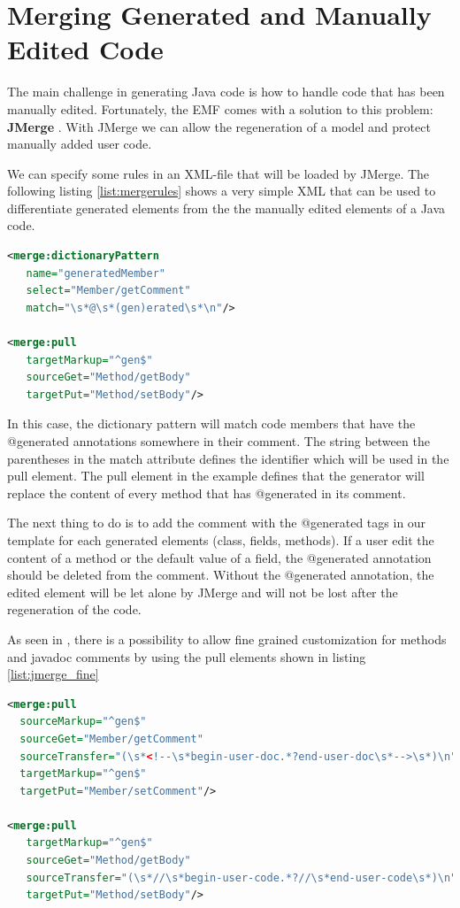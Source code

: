 \section{Merging Generated and Manually Edited Code}
The main challenge in generating Java code is how to handle code that has been manually edited. Fortunately, the EMF comes with a solution to this problem: \textbf{JMerge} \cite{JMERGEFAQ}. With JMerge we can allow the regeneration of a model and protect manually added user code. 

We can specify some rules in an XML-file that will be loaded by JMerge.  The following listing \ref{list:mergerules} shows a very simple XML that can be used to differentiate generated elements from the the manually edited elements of a Java code. 

\begin{lstlisting}[language=xml, caption = Example JMerge Rule, label=list:mergerules]
<merge:dictionaryPattern
   name="generatedMember" 
   select="Member/getComment" 
   match="\s*@\s*(gen)erated\s*\n"/>

<merge:pull 
   targetMarkup="^gen$"
   sourceGet="Method/getBody"
   targetPut="Method/setBody"/>
\end{lstlisting}

In this case, the dictionary pattern will match code members that have the @generated annotations somewhere in their comment. The string between the parentheses in the match attribute defines the identifier which will be used in the pull element. The pull element in the example defines that the generator will replace the content of every method that has @generated in its comment.

The next thing to do is to add the comment with the @generated tags in our template for each generated elements (class, fields, methods). 
If a user edit the content of a method or the default value of a field, the @generated annotation should be deleted from the comment. Without the @generated annotation, the edited element will be let alone by JMerge and will not be lost after the regeneration of the code.  

As seen in \cite{APJMERGE}, there is a possibility to allow fine grained customization for methods and javadoc comments by using the pull elements shown in listing \ref{list:jmerge_fine}
\begin{lstlisting}[language=xml, caption=JMerge Example: fine grained customization for javadoc comments and methods, label = list:jmerge_fine]
<merge:pull 
  sourceMarkup="^gen$"
  sourceGet="Member/getComment"
  sourceTransfer="(\s*<!--\s*begin-user-doc.*?end-user-doc\s*-->\s*)\n"
  targetMarkup="^gen$"
  targetPut="Member/setComment"/>
  
<merge:pull 
   targetMarkup="^gen$"
   sourceGet="Method/getBody"
   sourceTransfer="(\s*//\s*begin-user-code.*?//\s*end-user-code\s*)\n"
   targetPut="Method/setBody"/>

\end{lstlisting}

